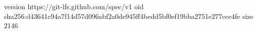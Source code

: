 version https://git-lfs.github.com/spec/v1
oid sha256:d43641c94a7f14d57d096abf2a0de945ff4bedd5bf0ef19bba2751e277cce4fe
size 2146
